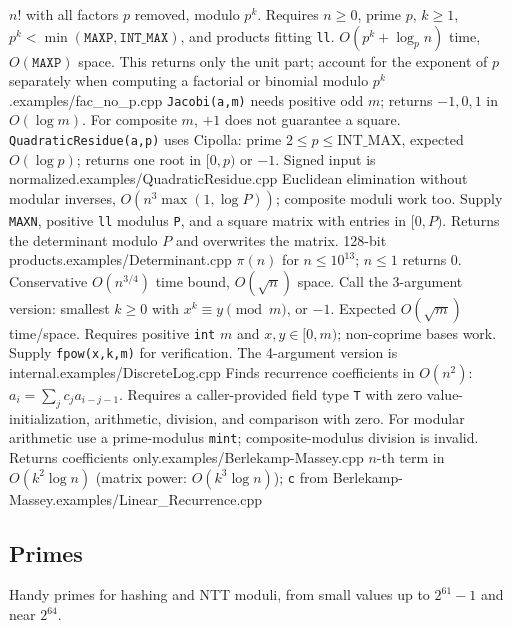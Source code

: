 {$n!$ with all factors $p$ removed, modulo $p^k$. Requires $n\ge0$, prime $p$, $k\ge1$, $p^k<\min(\texttt{MAXP},\texttt{INT\_MAX})$, and products fitting \texttt{ll}. $O(p^k+\log_p n)$ time, $O(\texttt{MAXP})$ space. This returns only the unit part; account for the exponent of $p$ separately when computing a factorial or binomial modulo $p^k$.}{examples/fac_no_p.cpp}
%
{\texttt{Jacobi(a,m)} needs positive odd $m$; returns $-1,0,1$ in $O(\log m)$. For composite $m$, $+1$ does not guarantee a square. \texttt{QuadraticResidue(a,p)} uses Cipolla: prime $2\le p\le\mathrm{INT\_MAX}$, expected $O(\log p)$; returns one root in $[0,p)$ or $-1$. Signed input is normalized.}{examples/QuadraticResidue.cpp}
%
{Euclidean elimination without modular inverses, $O(n^3\max(1,\log P))$; composite moduli work too. Supply \texttt{MAXN}, positive \texttt{ll} modulus \texttt{P}, and a square matrix with entries in $[0,P)$. Returns the determinant modulo $P$ and overwrites the matrix. 128-bit products.}{examples/Determinant.cpp}
%
{$\pi(n)$ for $n\le10^{13}$; $n\le1$ returns 0. Conservative $O(n^{3/4})$ time bound, $O(\sqrt n)$ space.}
%
{Call the 3-argument version: smallest $k\ge0$ with $x^k\equiv y\pmod m$, or $-1$. Expected $O(\sqrt m)$ time/space. Requires positive \texttt{int} $m$ and $x,y\in[0,m)$; non-coprime bases work. Supply \texttt{fpow(x,k,m)} for verification. The 4-argument version is internal.}{examples/DiscreteLog.cpp}
%
{Finds recurrence coefficients in $O(n^2)$: $a_i=\sum_j c_j a_{i-j-1}$. Requires a caller-provided field type \texttt{T} with zero value-initialization, arithmetic, division, and comparison with zero. For modular arithmetic use a prime-modulus \texttt{mint}; composite-modulus division is invalid. Returns coefficients only.}{examples/Berlekamp-Massey.cpp}
%
{$n$-th term in $O(k^2\log n)$ (matrix power: $O(k^3\log n)$); \texttt{c} from Berlekamp-Massey.}{examples/Linear_Recurrence.cpp}
\subsection{Primes}
{\footnotesize Handy primes for hashing and NTT moduli, from small values up to $2^{61}-1$ and near $2^{64}$.\par}\vspace{-0.6em}%

% 
